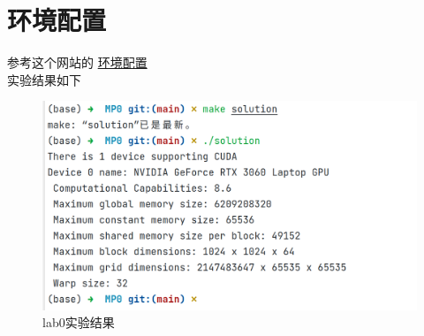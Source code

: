 \documentclass[UTF8]{ctexart}
\begin{document}
\section{环境配置}

参考这个网站的
\href{http://doraemonzzz.com/2022/12/25/2022-12-25-ECE408-\%E7\%8E\%AF\%E5\%A2\%83\%E9\%85\%8D\%E7\%BD\%AE\%E4\%BB\%A5\%E5\%8F\%8ALab-0/#Lab-0}{环境配置}\\

实验结果如下
\begin{figure}[ht]
    \centering
    \includegraphics[width=1.0\textwidth]{photos/lab0.png}
    \caption{lab0实验结果}
    \label{fig:1}
\end{figure}
\end{document}
